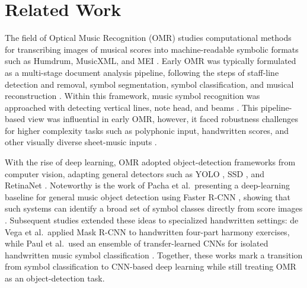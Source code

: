 \documentclass{article}
\begin{document}
\section{Related Work}

The field of Optical Music Recognition (OMR) studies computational methods for transcribing images of musical scores into machine-readable symbolic formats such as Humdrum, MusicXML, and MEI \cite{calvo-zaragoza_understanding_2021}. Early OMR was typically formulated as a multi-stage document analysis pipeline, following the steps of staff-line detection and removal, symbol segmentation, symbol classification, and musical reconstruction \cite{blostein1992critical, bainbridge1997extensible, bainbridge2001challenge}. Within this framework, music symbol recognition was approached with detecting vertical lines, note head, and beams %
\cite{rebelo2010optical, baro2016compound}. This pipeline-based view was influential in early OMR, however, it faced robustness challenges for higher complexity tasks such as polyphonic input, handwritten scores, and other visually diverse sheet-music inputs \cite{hartelt2022medieval}. 

With the rise of deep learning, OMR adopted object-detection frameworks from computer vision, adapting general detectors such as YOLO \cite{redmon2016yolo}, SSD \cite{liu2016ssd}, and RetinaNet \cite{lin2017focal}. %
Noteworthy is the  work of Pacha et al.\ presenting a deep-learning baseline for general music object detection using Faster R-CNN  \cite{ren2016faster}, showing that such systems can identify a broad set of symbol classes directly from score images \cite{pacha2018baseline}. Subsequent studies extended these ideas to specialized handwritten settings: de Vega et al.\ applied Mask R-CNN to handwritten four-part harmony exercises\cite{devega2022omr}, while Paul et al.\ used an ensemble of transfer-learned CNNs %
for isolated handwritten music symbol classification \cite{paul2022ensemble}. Together, these works mark a transition from symbol classification to CNN-based deep learning while still treating OMR as an object-detection task.
\end{document}
